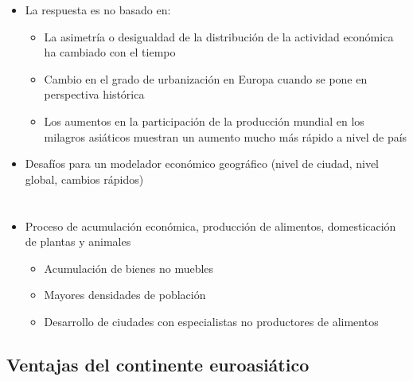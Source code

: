 \begin{itemize}
    \item La respuesta es no basado en:
    \begin{itemize}
	\item La asimetría o desigualdad de la distribución de la actividad económica ha cambiado con el tiempo
	\item Cambio en el grado de urbanización en Europa cuando se pone en perspectiva histórica
	\item Los aumentos en la participación de la producción mundial en los milagros asiáticos muestran un aumento mucho más rápido a nivel de país
    \end{itemize}
    \item Desafíos para un modelador económico geográfico (nivel de ciudad, nivel global, cambios rápidos)
\end{itemize}

\section{}
\begin{itemize}
	\item Proceso de acumulación económica,  producción de alimentos,  domesticación de plantas y animales  
	\begin{itemize}
	    \item Acumulación de bienes no muebles 
	    \item Mayores densidades de población 
	    \item Desarrollo de ciudades con especialistas no productores de alimentos \\
	\end{itemize}
\end{itemize}

\subsection{Ventajas del continente euroasiático}
		
